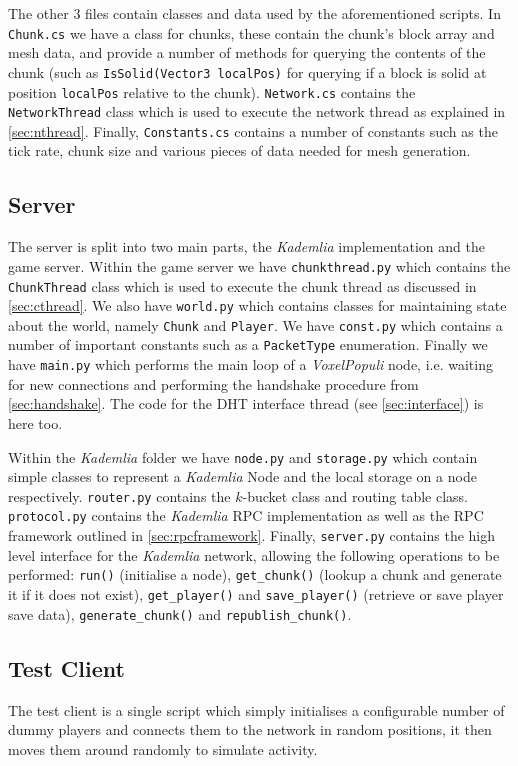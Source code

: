 \documentclass[10pt,twoside,notitlepage,a4paper]{report}
\newcommand{\kademlia}{\emph{Kademlia}}
\newcommand{\K}{$k$}
\newcommand{\voxpop}{\emph{VoxelPopuli}}
\begin{document}
	The other $3$ files contain classes and data used by the aforementioned scripts. In {\tt Chunk.cs} we have a class for chunks, these contain the chunk's block array and mesh data, and provide a number of methods for querying the contents of the chunk (such as {\tt IsSolid(Vector3 localPos)} for querying if a block is solid at position {\tt localPos} relative to the chunk). {\tt Network.cs} contains the {\tt NetworkThread} class which is used to execute the network thread as explained in \cref{sec:nthread}. Finally, {\tt Constants.cs} contains a number of constants such as the tick rate, chunk size and various pieces of data needed for mesh generation.
	
	\subsection{Server}
	The server is split into two main parts, the \kademlia{} implementation and the game server. Within the game server we have {\tt chunkthread.py} which contains the {\tt ChunkThread} class which is used to execute the chunk thread as discussed in \cref{sec:cthread}. We also have {\tt world.py} which contains classes for maintaining state about the world, namely {\tt Chunk} and {\tt Player}. We have {\tt const.py} which contains a number of important constants such as a {\tt PacketType} enumeration. Finally we have {\tt main.py} which performs the main loop of a \voxpop{} node, i.e. waiting for new connections and performing the handshake procedure from \cref{sec:handshake}. The code for the DHT interface thread (see \cref{sec:interface}) is here too.
	
	Within the \kademlia{} folder we have {\tt node.py} and {\tt storage.py} which contain simple classes to represent a \kademlia{} Node and the local storage on a node respectively. {\tt router.py} contains the \K-bucket class and routing table class. {\tt protocol.py} contains the \kademlia{} RPC implementation as well as the RPC framework outlined in \cref{sec:rpcframework}. Finally, {\tt server.py} contains the high level interface for the \kademlia{} network, allowing the following operations to be performed: {\tt run()} (initialise a node), {\tt get\_chunk()} (lookup a chunk and generate it if it does not exist), {\tt get\_player()} and {\tt save\_player()} (retrieve or save player save data), {\tt generate\_chunk()} and {\tt republish\_chunk()}.
	
	\subsection{Test Client}
	The test client is a single script which simply initialises a configurable number of dummy players and connects them to the network in random positions, it then moves them around randomly to simulate activity.
	
\end{document}
